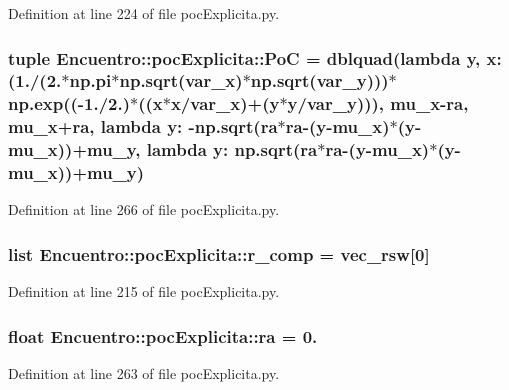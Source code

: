 \-Definition at line 224 of file poc\-Explicita.\-py.

\subsubsection[{\-Po\-C}]{\setlength{\rightskip}{0pt plus 5cm}tuple {\bf \-Encuentro\-::poc\-Explicita\-::\-Po\-C} = dblquad(lambda y, x\-: (1./(2.$\ast$np.\-pi$\ast$np.\-sqrt({\bf var\-\_\-x})$\ast$np.\-sqrt({\bf var\-\_\-y})))$\ast$np.\-exp((-\/1./2.)$\ast$((x$\ast$x/{\bf var\-\_\-x})+(y$\ast$y/{\bf var\-\_\-y}))), {\bf mu\-\_\-x}-\/{\bf ra}, {\bf mu\-\_\-x}+{\bf ra}, lambda y\-: -\/np.\-sqrt({\bf ra}$\ast${\bf ra}-\/(y-\/{\bf mu\-\_\-x})$\ast$(y-\/{\bf mu\-\_\-x}))+{\bf mu\-\_\-y}, lambda y\-: np.\-sqrt({\bf ra}$\ast${\bf ra}-\/(y-\/{\bf mu\-\_\-x})$\ast$(y-\/{\bf mu\-\_\-x}))+{\bf mu\-\_\-y})}\label{namespace_encuentro_1_1poc_explicita_a54832d160924f6a2ad26bc221960af11}


\-Definition at line 266 of file poc\-Explicita.\-py.

\subsubsection[{r\-\_\-comp}]{\setlength{\rightskip}{0pt plus 5cm}list {\bf \-Encuentro\-::poc\-Explicita\-::r\-\_\-comp} = vec\-\_\-rsw[0]}\label{namespace_encuentro_1_1poc_explicita_a119646b39dd230d6c8dff5c171732d61}


\-Definition at line 215 of file poc\-Explicita.\-py.

\subsubsection[{ra}]{\setlength{\rightskip}{0pt plus 5cm}float {\bf \-Encuentro\-::poc\-Explicita\-::ra} = 0.}\label{namespace_encuentro_1_1poc_explicita_a3177812fa5ffa001cb39c70755dbb83a}


\-Definition at line 263 of file poc\-Explicita.\-py.

